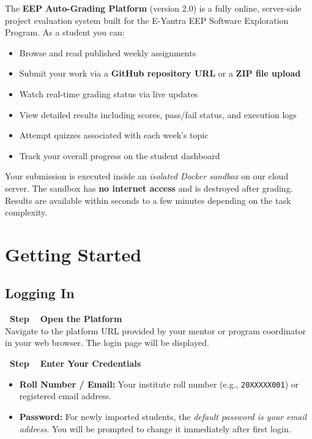 \documentclass[12pt,a4paper]{article}
\newcounter{stepnum}
\newcommand{\step}[1]{%
  \stepcounter{stepnum}%
  \vspace{6pt}%
  \noindent\colorbox{eyantraBlue}{\color{white}\bfseries\small\ Step \thestepnum\ }%
  \hspace{4pt}\textbf{#1}\\[4pt]%
}
\begin{document}
The \textbf{EEP Auto-Grading Platform} (version 2.0) is a fully online, server-side project evaluation system built for the E-Yantra EEP Software Exploration Program. As a student you can:

\begin{itemize}[leftmargin=*]
  \item Browse and read published weekly assignments
  \item Submit your work via a \textbf{GitHub repository URL} or a \textbf{ZIP file upload}
  \item Watch real-time grading status via live updates
  \item View detailed results including scores, pass/fail status, and execution logs
  \item Attempt quizzes associated with each week's topic
  \item Track your overall progress on the student dashboard
\end{itemize}

\begin{infobox}
  Your submission is executed inside an \emph{isolated Docker sandbox} on our cloud server. The sandbox has \textbf{no internet access} and is destroyed after grading. Results are available within seconds to a few minutes depending on the task complexity.
\end{infobox}

\section{Getting Started}

\subsection{Logging In}

\setcounter{stepnum}{0}

\step{Open the Platform}
Navigate to the platform URL provided by your mentor or program coordinator in your web browser. The login page will be displayed.

\step{Enter Your Credentials}
\begin{itemize}
  \item \textbf{Roll Number / Email:} Your institute roll number (e.g., \texttt{20XXXXX001}) or registered email address.
  \item \textbf{Password:} For newly imported students, the \emph{default password is your email address}. You will be prompted to change it immediately after first login.
\end{itemize}
\end{document}
